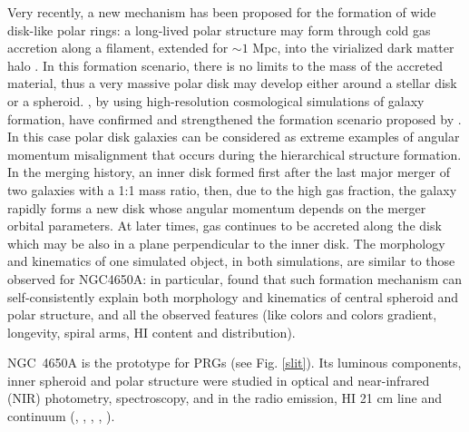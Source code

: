 \documentclass[12pt,preprint]{aastex}
\begin{document}
Very recently, a new mechanism has been proposed for the formation of
wide disk-like polar rings: a long-lived polar structure may form
through cold gas accretion along a filament, extended for $\sim 1$
Mpc, into the virialized dark matter halo \citep{Mac06}. In this
formation scenario, there is no limits to the mass of the accreted
material, thus a very massive polar disk may develop either around a
stellar disk or a spheroid.  \citet{Bro08}, by using high-resolution
cosmological simulations of galaxy formation, have confirmed and
strengthened the formation scenario proposed by \citet{Mac06}.  In
this case polar disk galaxies can be considered as extreme examples of
angular momentum misalignment that occurs during the hierarchical
structure formation. In the merging history, an inner disk formed
first after the last major merger of two galaxies with a 1:1 mass
ratio, then, due to the high gas fraction, the galaxy rapidly forms a
new disk whose angular momentum depends on the merger orbital
parameters. At later times, gas continues to be accreted along the
disk which may be also in a plane perpendicular to the inner disk. The
morphology and kinematics of one simulated object, in both
simulations, are similar to those observed for NGC4650A: in
particular, \citet{Bro08} found that such formation mechanism can
self-consistently explain both morphology and kinematics of central
spheroid and polar structure, and all the observed features (like
colors and colors gradient, longevity, spiral arms, HI content and
distribution).

NGC~4650A is the prototype for PRGs (see Fig. \ref{slit}). Its
luminous components, inner spheroid and polar structure were
studied in optical and near-infrared (NIR) photometry,
spectroscopy, and in the radio emission, HI 21 cm line and continuum
(\citealt{Arn97}, \citealt{Gal02}, \citealt{Iod02}, \citealt{Swa03},
\citealt{Iod06}).
\end{document}
